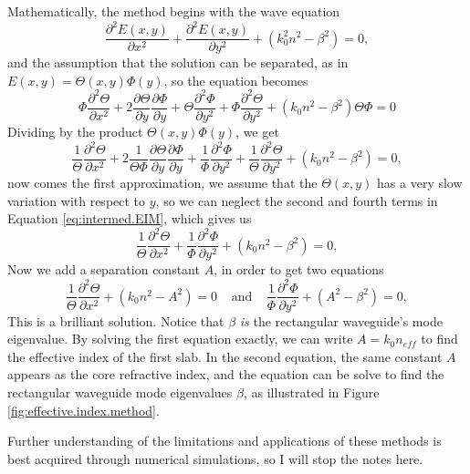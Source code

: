 Mathematically, the method begins with the wave equation
\begin{equation}
    \frac{\partial^2E(x,y)}{\partial x^2}+\frac{\partial^2E(x,y)}{\partial y^2}+(k_0^2n^2-\beta^2)=0,
\end{equation}
and the assumption that the solution can be separated, as in $E(x,y)=\Theta(x,y)\Phi(y)$, so the equation becomes
\begin{equation}
    \Phi\frac{\partial^2\Theta}{\partial x^2}+2\frac{\partial\Theta}{\partial y}\frac{\partial\Phi}{\partial y}+\Theta\frac{\partial^2\Phi}{\partial y^2}+\Phi\frac{\partial^2\Theta}{\partial y^2}+(k_0n^2-\beta^2)\Theta\Phi=0
\end{equation}
Dividing by the product $\Theta(x,y)\Phi(y)$, we get
\begin{equation}
    \frac{1}{\Theta}\frac{\partial^2\Theta}{\partial x^2}+2\frac{1}{\Theta\Phi}\frac{\partial\Theta}{\partial y}\frac{\partial\Phi}{\partial y}+\frac{1}{\Phi}\frac{\partial^2\Phi}{\partial y^2}+\frac{1}{\Theta}\frac{\partial^2\Theta}{\partial y^2}+(k_0n^2-\beta^2)=0,
    \label{eq:intermed.EIM}
\end{equation}
now comes the first approximation, we assume that the $\Theta(x,y)$ has a very slow variation with respect to $y$, so we can neglect the second and fourth terms in Equation \ref{eq:intermed.EIM}, which gives us
\begin{equation}
    \frac{1}{\Theta}\frac{\partial^2\Theta}{\partial x^2}+\frac{1}{\Phi}\frac{\partial^2\Phi}{\partial y^2}+(k_0n^2-\beta^2)=0,
\end{equation}
Now we add a separation constant $A$, in order to get two equations
\begin{equation}
    \frac{1}{\Theta}\frac{\partial^2\Theta}{\partial x^2}+(k_0n^2-A^2)=0\;\;\;\;\text{and}\;\;\;\;\frac{1}{\Phi}\frac{\partial^2\Phi}{\partial y^2}+(A^2-\beta^2)=0,
\end{equation}
This is a brilliant solution. Notice that $\beta$ \textit{is} the rectangular waveguide's mode eigenvalue. By solving the first equation exactly, we can write $A=k_0n_{eff}$ to find the effective index of the first slab. In the second equation, the same constant $A$ appears as the core refractive index, and the equation can be solve to find the rectangular waveguide mode eigenvalues $\beta$, as illustrated in Figure \ref{fig:effective.index.method}.

\hrulefill

Further understanding of the limitations and applications of these methods is best acquired through numerical simulations, so I will stop the notes here.

